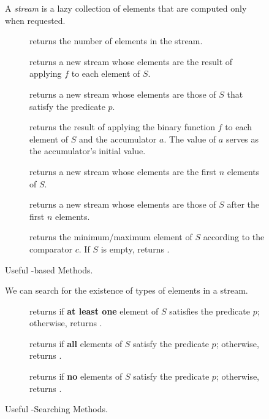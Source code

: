 \begin{figure}[tp]
  \small
  \begin{tcolorbox}[title=Java Streams]
    A \textit{stream} is a lazy collection of elements that are computed only when requested.
    \vspace{2ex}
  \begin{description}
    \item [] returns the number of elements in the stream.
    \item [] returns a new stream whose elements are the result of applying $f$ to each element of $S$.
    \item [] returns a new stream whose elements are those of $S$ that satisfy the predicate $p$.
    \item [] returns the result of applying the binary function $f$ to each element of $S$ and the accumulator $a$. The value of $a$ serves as the accumulator's initial value.
    \item [] returns a new stream whose elements are the first $n$ elements of $S$.
    \item [] returns a new stream whose elements are those of $S$ after the first $n$ elements.
    \item [] returns the minimum/maximum element of $S$ according to the comparator $c$. If $S$ is empty, returns .
  \end{description}
\end{tcolorbox}
  \caption{Useful -based Methods.}
  \label{fig:streams}
\end{figure}

\begin{figure}[tp]
  \small
  \begin{tcolorbox}[title=Java Stream--Searching Methods]
    We can search for the existence of types of elements in a stream.
    \vspace{2ex}
  \begin{description}
    \item [] returns  if \textbf{at least one} element of $S$ satisfies the predicate $p$; otherwise, returns .
    \item [] returns  if \textbf{all} elements of $S$ satisfy the predicate $p$; otherwise, returns .
    \item [] returns  if \textbf{no} elements of $S$ satisfy the predicate $p$; otherwise, returns .
  \end{description}
\end{tcolorbox}
  \caption{Useful -Searching Methods.}
  \label{fig:streams-searching}
\end{figure}

